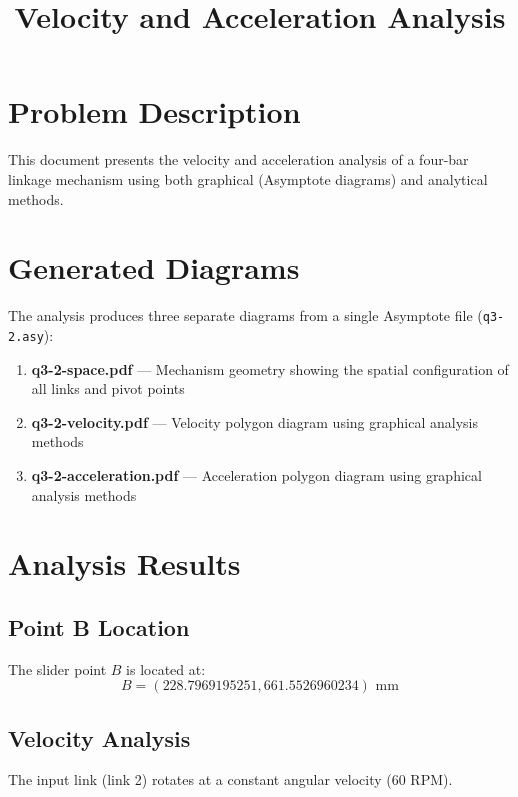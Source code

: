 \documentclass[12pt]{article}
\title{Velocity and Acceleration Analysis}
\author{}
\date{}
\begin{document}
\maketitle

\section*{Problem Description}

This document presents the velocity and acceleration analysis of a four-bar linkage mechanism using both graphical (Asymptote diagrams) and analytical methods.

\section*{Generated Diagrams}

The analysis produces three separate diagrams from a single Asymptote file (\texttt{q3-2.asy}):

\begin{enumerate}
  \item \textbf{q3-2-space.pdf} — Mechanism geometry showing the spatial configuration of all links and pivot points
  \item \textbf{q3-2-velocity.pdf} — Velocity polygon diagram using graphical analysis methods
  \item \textbf{q3-2-acceleration.pdf} — Acceleration polygon diagram using graphical analysis methods
\end{enumerate}

\section*{Analysis Results}

\subsection*{Point B Location}

The slider point $B$ is located at:
$$B = (228.7969195251, 661.5526960234) \text{ mm}$$

\subsection*{Velocity Analysis}

The input link (link 2) rotates at a constant angular velocity (60 RPM).
\end{document}
